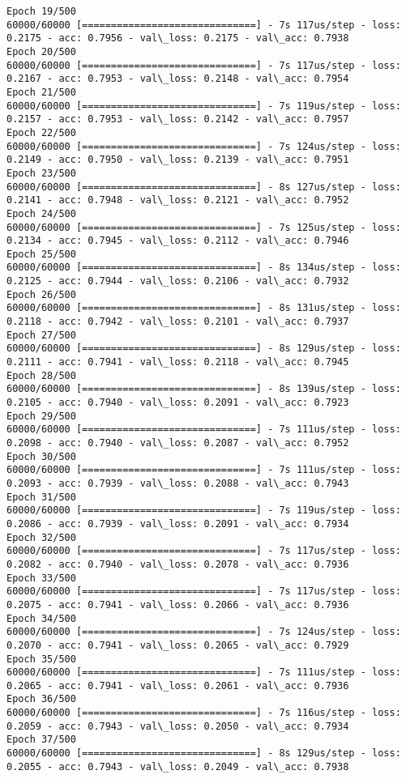 \documentclass[11pt]{article}
\begin{document}
\begin{Verbatim}[commandchars=\\\{\}]
Epoch 19/500
60000/60000 [==============================] - 7s 117us/step - loss: 0.2175 - acc: 0.7956 - val\_loss: 0.2175 - val\_acc: 0.7938
Epoch 20/500
60000/60000 [==============================] - 7s 117us/step - loss: 0.2167 - acc: 0.7953 - val\_loss: 0.2148 - val\_acc: 0.7954
Epoch 21/500
60000/60000 [==============================] - 7s 119us/step - loss: 0.2157 - acc: 0.7953 - val\_loss: 0.2142 - val\_acc: 0.7957
Epoch 22/500
60000/60000 [==============================] - 7s 124us/step - loss: 0.2149 - acc: 0.7950 - val\_loss: 0.2139 - val\_acc: 0.7951
Epoch 23/500
60000/60000 [==============================] - 8s 127us/step - loss: 0.2141 - acc: 0.7948 - val\_loss: 0.2121 - val\_acc: 0.7952
Epoch 24/500
60000/60000 [==============================] - 7s 125us/step - loss: 0.2134 - acc: 0.7945 - val\_loss: 0.2112 - val\_acc: 0.7946
Epoch 25/500
60000/60000 [==============================] - 8s 134us/step - loss: 0.2125 - acc: 0.7944 - val\_loss: 0.2106 - val\_acc: 0.7932
Epoch 26/500
60000/60000 [==============================] - 8s 131us/step - loss: 0.2118 - acc: 0.7942 - val\_loss: 0.2101 - val\_acc: 0.7937
Epoch 27/500
60000/60000 [==============================] - 8s 129us/step - loss: 0.2111 - acc: 0.7941 - val\_loss: 0.2118 - val\_acc: 0.7945
Epoch 28/500
60000/60000 [==============================] - 8s 139us/step - loss: 0.2105 - acc: 0.7940 - val\_loss: 0.2091 - val\_acc: 0.7923
Epoch 29/500
60000/60000 [==============================] - 7s 111us/step - loss: 0.2098 - acc: 0.7940 - val\_loss: 0.2087 - val\_acc: 0.7952
Epoch 30/500
60000/60000 [==============================] - 7s 111us/step - loss: 0.2093 - acc: 0.7939 - val\_loss: 0.2088 - val\_acc: 0.7943
Epoch 31/500
60000/60000 [==============================] - 7s 119us/step - loss: 0.2086 - acc: 0.7939 - val\_loss: 0.2091 - val\_acc: 0.7934
Epoch 32/500
60000/60000 [==============================] - 7s 117us/step - loss: 0.2082 - acc: 0.7940 - val\_loss: 0.2078 - val\_acc: 0.7936
Epoch 33/500
60000/60000 [==============================] - 7s 117us/step - loss: 0.2075 - acc: 0.7941 - val\_loss: 0.2066 - val\_acc: 0.7936
Epoch 34/500
60000/60000 [==============================] - 7s 124us/step - loss: 0.2070 - acc: 0.7941 - val\_loss: 0.2065 - val\_acc: 0.7929
Epoch 35/500
60000/60000 [==============================] - 7s 111us/step - loss: 0.2065 - acc: 0.7941 - val\_loss: 0.2061 - val\_acc: 0.7936
Epoch 36/500
60000/60000 [==============================] - 7s 116us/step - loss: 0.2059 - acc: 0.7943 - val\_loss: 0.2050 - val\_acc: 0.7934
Epoch 37/500
60000/60000 [==============================] - 8s 129us/step - loss: 0.2055 - acc: 0.7943 - val\_loss: 0.2049 - val\_acc: 0.7938

\end{Verbatim}
\end{document}
